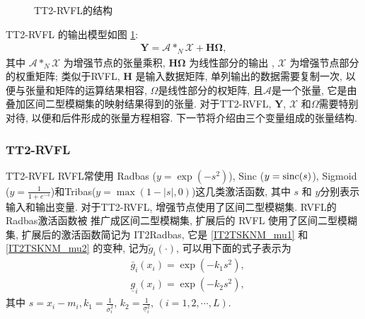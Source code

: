 \begin{figure} [!htbp]
\begin{center}
\caption{TT2-RVFL的结构}
\label{TensorRVFL20180927-2}
\end{center}
\end{figure}
TT2-RVFL 的输出模型如图 \ref{TensorRVFL20180927-2}:
\begin{align}
    \bm Y=\mathcal A *_N \mathcal X+\bm H \bm \Omega,\label{TensorRVFLEq05}
\end{align}
其中 $\mathcal A *_N \mathcal X$ 为增强节点的张量乘积, $\bm H \bm \Omega$ 为线性部分的输出 , $\mathcal X$ 为增强节点部分的权重矩阵;
类似于RVFL, $\bm H$ 是输入数据矩阵, 单列输出的数据需要复制一次, 以便与张量和矩阵的运算结果相容, $\Omega$是线性部分的权矩阵, 且$\mathcal A$是一个张量, 它是由 叠加区间二型模糊集的映射结果得到的张量.
对于TT2-RVFL, $\bm Y$, $\mathcal X$ 和$\Omega$需要特别对待, 以便和后件形成的张量方程相容. 下一节将介绍由三个变量组成的张量结构.
\subsubsection{TT2-RVFL}{TT2-RVFL}
RVFL常使用 Radbas ($y = \exp(-s^2)$), Sinc ($y = \textup{sinc} (s)$), Sigmoid ($y = \frac 1 {1+e^{-s} } $)和Tribas($y = \max(1 - |s|, 0)$)这几类激活函数, 其中 $s$ 和 $y$分别表示输入和输出变量.
对于TT2-RVFL, 增强节点使用了区间二型模糊集. RVFL的 Radbas激活函数被 推广成区间二型模糊集, 扩展后的 RVFL 使用了区间二型模糊集, 扩展后的激活函数简记为 IT2Radbas, 它是 \eqref{IT2TSKNM_mu1} 和 \eqref{IT2TSKNM_mu2} 的变种,
记为$\tilde g_i(\cdot)$, 可以用下面的式子表示为
 \begin{align}
  &\bar{g} _{i} (x_i)=\exp(-k_1 s^2),\label{IT2TSKNM_g1} \\
  &\underline{g} _{i} (x_i)=\exp(-k_2 s^2),\label{IT2TSKNM_g2}
\end{align}
其中 $s=x_i-m_{i}, k_1=\frac{1} {\bar{\sigma} ^2_{i} } $, $k_2=\frac{1} {\underline{\sigma} ^2_{i} },\, (i=1,2,\cdots, L)$.

